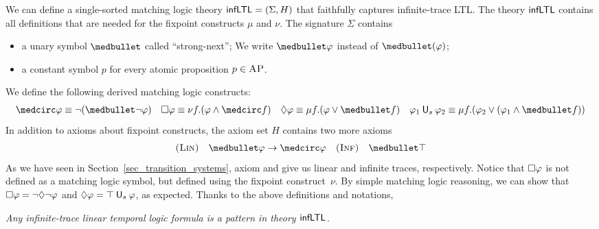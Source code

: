 \documentclass{amsart}
\begin{document}
We can define 
a single-sorted matching logic theory 
$\mathsf{infLTL} = ({\Sigma}, H)$ that
faithfully captures infinite-trace LTL.
The theory $\mathsf{infLTL}$ contains all definitions
that are needed for the fixpoint constructs $\mu$ and $\nu$.
The signature $\Sigma$ contains
\begin{itemize}
\item a unary symbol $\snext$ called ``strong-next'';
      We write $\snext \varphi$ instead of $\snext(\varphi)$;
\item a constant symbol $p$ for every atomic proposition $p \in \textsc{AP}$.
\end{itemize}
We define the following derived matching logic constructs:
\begin{align*}
\wnext \varphi \equiv \neg (\snext \neg \varphi)
&&
\always \varphi \equiv \nu f . (\varphi \wedge \wnext f)
&&
\eventually \varphi \equiv \mu f . (\varphi \vee \snext f)
&&
\varphi_1 \Us \varphi_2 \equiv \mu f . (\varphi_2 \vee (\varphi_1 \wedge \snext f))
\end{align*}
In addition to axioms about fixpoint constructs, the axiom set $H$ contains two more axioms
\begin{align*}
\prule{Lin} \quad \snext \varphi \imp \wnext \varphi
&&
\prule{Inf} \quad \snext \top
\end{align*}
As we have seen in Section~\ref{sec_transition_systems},
axiom \Lin and \Inf give us linear and infinite traces, respectively. 
Notice that ${\square} \varphi$ is not defined as a matching logic symbol, 
but defined using the fixpoint construct~$\nu$.
By simple matching logic reasoning, we can show that
$
{\square} \varphi = \neg {\lozenge} \neg \varphi
$
and 
$
{\lozenge} \varphi = \top \mathbin{\mathsf{U}_s} \varphi
$, as expected.
Thanks to the above definitions and notations,
\begin{center}
\emph{Any infinite-trace linear temporal logic formula is a pattern
in theory $\mathsf{infLTL}$.}
\end{center}
%
\end{document}
